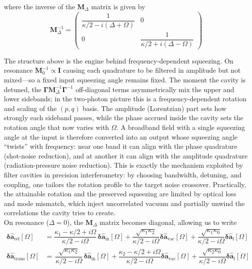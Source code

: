 where the inverse of the $\mathbf{M}_\Delta$ matrix is given by 
\begin{equation}
\mathbf{M}_\Delta^{-1} =
\begin{pmatrix}
\dfrac{1}{\kappa/2 - i(\Delta + \Omega)} & 0 \\
0 & \dfrac{1}{\kappa/2 + i(\Delta - \Omega)}
\end{pmatrix}
\end{equation}

The structure above is the engine behind frequency-dependent squeezing. On resonance $\mathbf{M}^{-1}_0 \propto \mathbf{I}$ causing each quadrature to be filtered in amplitude but not mixed—so a fixed input squeezing angle remains fixed. The moment the cavity is detuned, the $\mathbf{\Gamma}\mathbf{M}^{-1}_\Delta \mathbf{\Gamma}^{-1}$ off-diagonal terms asymmetrically mix the upper and lower sidebands; in the two-photon picture this is a frequency-dependent rotation and scaling of the $(p,q)$ basis. The amplitude (Lorentzian) part sets how strongly each sideband passes, while the phase accrued inside the cavity sets the rotation angle that now varies with $\Omega$. A broadband field with a single squeezing angle at the input is therefore converted into an output whose squeezing angle “twists” with frequency: near one band it can align with the phase quadrature (shot-noise reduction), and at another it can align with the amplitude quadrature (radiation-pressure noise reduction). This is exactly the mechanism exploited by filter cavities in precision interferometry: by choosing bandwidth, detuning, and coupling, one tailors the rotation profile to the target noise crossover. Practically, the attainable rotation and the preserved squeezing are limited by optical loss and mode mismatch, which inject uncorrelated vacuum and partially unwind the correlations the cavity tries to create. \\


On resonance ($\Delta=0$), the $\mathbf{M}_\Delta$ matrix becomes diagonal, allowing us to write 
\begin{equation}
  \begin{split}
  \mathbf{\delta \hat{a}_{\mathrm{ref}}}[\Omega]   &= \dfrac{\kappa_1-\kappa/2+i\Omega}{\kappa/2-i\Omega}  \,  \mathbf{\delta \hat{a}_{\mathrm{in}}}[\Omega]   +   \dfrac{\sqrt{\kappa_1 \kappa_2} }{\kappa/2-i\Omega}  \mathbf{\delta \hat{a}_{\mathrm{vac}}}[\Omega] + \dfrac{\sqrt{\kappa_1 \kappa_0} }{\kappa/2-i\Omega}  \mathbf{\delta \hat{a}_{\mathrm{l}}}[\Omega]  \\
  \mathbf{\delta \hat{a}_{\mathrm{trans}}}[\Omega]   &= \, \dfrac{ \sqrt{\kappa_1 \kappa_2}}{\kappa/2-i\Omega}  \, \mathbf{\delta \hat{a}_{\mathrm{in}}}[\Omega]   +  \dfrac{\kappa_2-\kappa/2+i\Omega}{\kappa/2-i\Omega}   \mathbf{\delta \hat{a}_{\mathrm{vac}}}[\Omega]   + \dfrac{\sqrt{\kappa_2 \kappa_0} }{\kappa/2-i\Omega}  \mathbf{\delta \hat{a}_{\mathrm{l}}}[\Omega] 
  \end{split}
\end{equation}


